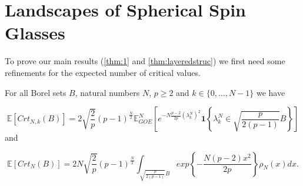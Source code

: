 \section{Landscapes of Spherical Spin Glasses}
To prove our main results (\ref{thm:1} and \ref{thm:layeredstruc}) we first need some refinements for the expected number of critical values.

\begin{theorem}
	For all Borel sets $B$, natural numbers $N$, $p\geq 2$ and $k\in\{0,\dots,N-1\}$ we have

	\begin{equation}\label{thm:2.1}
		\mathbb E[Crt_{N,k}(B)]=2\sqrt{\frac{2}{p}}(p-1)^{\frac{N}{2}}\mathbb E_{GOE}^N\left[e^{-N\frac{p-2}{2p}(\lambda_k^N)^2}\bm 1\left\{\lambda_k^N\in\sqrt{\frac{p}{2(p-1)}}B \right\}\right]
	\end{equation} and
	
	\begin{equation}\label{thm:2.2}
		\mathbb E[Crt_N(B)]=2N\sqrt{\frac{2}{p}}(p-1)^{\frac{N}{2}}\int_{\sqrt{\frac{p}{2(p-1)}}B}exp\left\{-\frac{N(p-2)x^2}{2p}\right\}\rho_N(x)dx.
	\end{equation}
\end{theorem}

